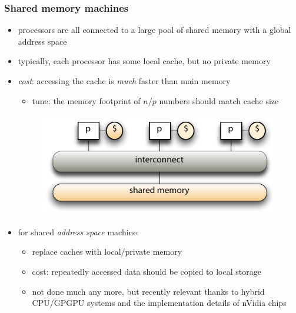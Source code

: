 \begin{frame}[fragile]
%
  \frametitle{Shared memory machines}
%
  \begin{itemize}
%
  \item processors are all connected to a large pool of shared memory with a global address
    space
  \item typically, each processor has some local cache, but no private memory
  \item {\em cost}: accessing the cache is {\em much} faster than main memory
    \begin{itemize}
      \item tune: the memory footprint of $n/p$ numbers should match cache size
    \end{itemize}
%
  \begin{figure}
    \centering
    \includegraphics[width=.70\linewidth]{figures/shared-memory.pdf}
    \label{fig:shared-memory}
  \end{figure}
%
  \item for shared {\em address space} machine:
    \begin{itemize}
      \item replace caches with local/private memory
      \item cost: repeatedly accessed data should be copied to local storage
      \item not done much any more, but recently relevant thanks to hybrid CPU/GPGPU systems and
        the implementation details of nVidia chips
    \end{itemize}
%
  \end{itemize}
%
\end{frame}

